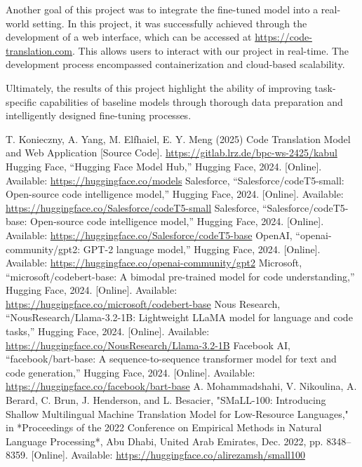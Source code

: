 \documentclass[conference]{IEEEtran}
\begin{document}
Another goal of this project was to integrate the fine-tuned model into a real-world setting. In this project, it was successfully achieved through the development of a web interface, which can be accessed at \url{https://code-translation.com}. This allows users to interact with our project in real-time. The development process encompassed containerization and cloud-based scalability.

Ultimately, the results of this project highlight the ability of improving task-specific capabilities of baseline models through thorough data preparation and intelligently designed fine-tuning processes.


\begin{thebibliography}{00}

T. Konieczny, A. Yang, M. Elfhaiel, E. Y. Meng (2025) Code Translation Model and Web Application [Source Code]. \url{https://gitlab.lrz.de/bpc-ws-2425/kabul}
Hugging Face, “Hugging Face Model Hub,” Hugging Face, 2024. [Online]. Available: \url{https://huggingface.co/models}
Salesforce, “Salesforce/codeT5-small: Open-source code intelligence model,” Hugging Face, 2024. [Online]. Available: \url{https://huggingface.co/Salesforce/codeT5-small}
Salesforce, “Salesforce/codeT5-base: Open-source code intelligence model,” Hugging Face, 2024. [Online]. Available: \url{https://huggingface.co/Salesforce/codeT5-base}
OpenAI, “openai-community/gpt2: GPT-2 language model,” Hugging Face, 2024. [Online]. Available: \url{https://huggingface.co/openai-community/gpt2}
Microsoft, “microsoft/codebert-base: A bimodal pre-trained model for code understanding,” Hugging Face, 2024. [Online]. Available: \url{https://huggingface.co/microsoft/codebert-base}
Nous Research, “NousResearch/Llama-3.2-1B: Lightweight LLaMA model for language and code tasks,” Hugging Face, 2024. [Online]. Available: \url{https://huggingface.co/NousResearch/Llama-3.2-1B}
Facebook AI, “facebook/bart-base: A sequence-to-sequence transformer model for text and code generation,” Hugging Face, 2024. [Online]. Available: \url{https://huggingface.co/facebook/bart-base}
A. Mohammadshahi, V. Nikoulina, A. Berard, C. Brun, J. Henderson, and L. Besacier, "SMaLL-100: Introducing Shallow Multilingual Machine Translation Model for Low-Resource Languages," in *Proceedings of the 2022 Conference on Empirical Methods in Natural Language Processing*, Abu Dhabi, United Arab Emirates, Dec. 2022, pp. 8348–8359. [Online]. Available: \url{https://huggingface.co/alirezamsh/small100}

\end{thebibliography}
\end{document}
